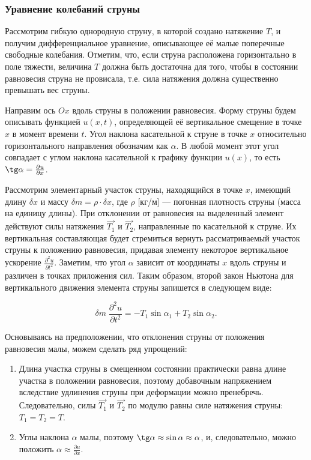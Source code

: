 \documentclass[12pt,a4paper,russian]{report}
\begin{document}
	
	\subsubsection{Уравнение колебаний струны}
	
	Рассмотрим гибкую однородную струну, в которой создано натяжение $T$, и получим дифференциальное уравнение, описывающее её малые поперечные свободные колебания. Отметим, что, если струна расположена горизонтально в поле тяжести, величина $T$ должна быть достаточна для того, чтобы в состоянии равновесия струна не провисала, т.е. сила натяжения должна существенно превышать вес струны. \cite{Tihonov_Urmatfiz}
	
	Направим ось $Ox$ вдоль струны в положении равновесия. Форму струны будем описывать функцией $u(x, t)$, определяющей её вертикальное смещение в точке $x$ в момент времени $t$. Угол наклона касательной к струне в точке $x$ относительно горизонтального направления обозначим как $\alpha$. В любой момент этот угол совпадает с углом наклона касательной к графику функции $u(x)$, то есть $\tg \alpha = \frac{\partial u}{\partial x}$. 
	
	
	Рассмотрим элементарный участок струны, находящийся в точке $x$, имеющий длину $\delta x$ и массу $\delta m = \rho \cdot \delta x$, где $\rho$ [кг/м] — погонная плотность струны (масса на единицу длины). При отклонении от равновесия на выделенный элемент действуют силы натяжения $\overrightarrow{T_1}$ и $\overrightarrow{T_2}$, направленные по касательной к струне. Их вертикальная составляющая будет стремиться вернуть рассматриваемый участок струны к положению равновесия, придавая элементу некоторое вертикальное ускорение $\frac{\partial^2 u}{\partial t^2}$. Заметим, что угол $\alpha$ зависит от координаты $x$ вдоль струны и различен в точках приложения сил. Таким образом, второй закон Ньютона для вертикального движения элемента струны запишется в следующем виде:
	
	\begin{equation} \label{eq:second_Newton_law}
		\delta m \; \frac{\partial^2 u}{\partial t^2} = - T_1 \sin \alpha_1 + T_2 \sin \alpha_2.
	\end{equation}
	
	Основываясь на предположении, что отклонения струны от положения равновесия малы, можем сделать ряд упрощений:
	
	\begin{enumerate}
		\item Длина участка струны в смещенном состоянии практически равна длине участка в положении равновесия, поэтому добавочным напряжением вследствие удлинения струны при деформации можно пренебречь. Следовательно, силы $\overrightarrow{T_1}$ и $\overrightarrow{T_2}$ по модулю равны силе натяжения струны: $T_1 = T_2 = T$.
		
		\item Углы наклона $\alpha$ малы, поэтому $\tg \alpha \approx \sin \alpha \approx \alpha$, и, следовательно, можно положить $\alpha \approx \frac{\partial u}{\partial x}$.
	\end{enumerate}
	
\end{document}
